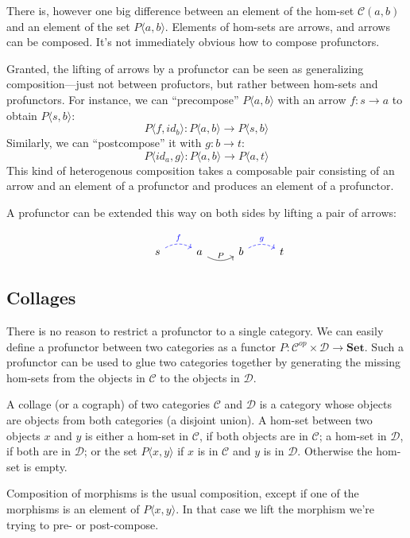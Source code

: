 \documentclass[DaoFP]{subfiles}
\begin{document}
There is, however one big difference between an element of the hom-set $ \mathcal{C}(a, b)$ and an element of the set $P\langle a, b \rangle$. Elements of hom-sets are arrows, and arrows can be composed. It's not immediately obvious how to compose profunctors. 

Granted, the lifting of arrows by a profunctor can be seen as generalizing composition---just not between profuctors, but rather between hom-sets and profunctors. For instance, we can ``precompose'' $P \langle a, b \rangle$ with an arrow $f \colon s \to a$ to obtain $P \langle s, b \rangle$:
\[ P\langle f, id_b \rangle \colon P \langle a, b \rangle \to P \langle s, b \rangle \]
Similarly, we can ``postcompose'' it with $g \colon b \to t$:
\[ P \langle id_a, g \rangle \colon P \langle a, b \rangle \to P \langle a, t \rangle \]
This kind of heterogenous composition takes a composable pair consisting of an arrow and an element of a profunctor and produces an element of a profunctor.

A profunctor can be extended this way on both sides by lifting a pair of arrows:

\[
 \begin{tikzcd}
  & s
  \arrow[r, bend left, dashed, blue, "f"]
 & a
 \arrow[r, bend right, "P"]
 & b
  \arrow[r, bend left, dashed, blue, "g"]
 &  t
  \end{tikzcd}
\]

\subsection{Collages}

There is no reason to restrict a profunctor to a single category. We can easily define a profunctor between two categories as a functor $ P \colon \mathcal{C}^{op} \times  \mathcal{D} \to \mathbf{Set}$. Such a profunctor can be used to glue two categories together by generating the missing hom-sets from the objects in $\mathcal{C}$ to the objects in $\mathcal{D}$. 

A collage (or a cograph) of two categories $\mathcal{C}$ and $\mathcal{D}$ is a category whose objects are objects from both categories (a disjoint union). A hom-set between two objects $x$ and $y$ is either a hom-set in $\mathcal{C}$, if both objects are in $\mathcal{C}$; a hom-set in $\mathcal{D}$, if both are in $\mathcal{D}$; or the set $P \langle x, y\rangle$ if $x$ is in $\mathcal{C}$ and $y$ is in $\mathcal{D}$. Otherwise the hom-set is empty. 

Composition of morphisms is the usual composition, except if one of the morphisms is an element of $P \langle x, y \rangle$. In that case we lift the morphism we're trying to pre- or post-compose. 
\end{document}
